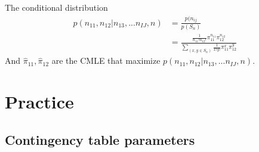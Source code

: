 \documentclass[11pt]{article} %
\begin{document}
\begin{itemize}
The conditional distribution
\begin{align*}
	p(n_{11}, n_{12}|n_{13}, ...n_{IJ}, n) &= \frac{p(n_{ij}}{p(S_n)}\\
	&= \frac{\frac{1}{n_{11}! n_{12}! } \pi_{11}^{n_{11}} \pi_{12}^{n_{12}}}{\sum_{(x, y \in S_n)} \frac{1}{x! y!} \pi_{11}^x \pi_{12}^y}
\end{align*}
And $\hat{\pi}_{11}, \hat{\pi}_{12}$ are the CMLE that maximize $p(n_{11}, n_{12}|n_{13}, ...n_{IJ}, n)$.

\end{itemize}


\section{Practice}
\subsection{Contingency table parameters}
\end{document}
